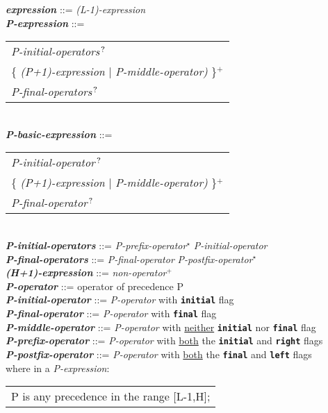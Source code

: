 \documentclass[12pt]{article}
\newcommand{\TT}[1]{{\tt \bfseries #1}}
\newcommand{\STAR}{{\Large $^\star$}}
\newcommand{\PLUS}[1][]{{$^{+#1}$}}
\newcommand{\QMARK}{{$^{\,\mbox{\footnotesize ?}}$}}
\newcommand{\emkey}[1]{{\em \bfseries #1}}
\newenvironment{indpar}[1][0.3in]%
	{\begin{list}{}%
		     {\setlength{\itemsep}{0in}%
		      \setlength{\topsep}{0in}%
		      \setlength{\parsep}{1ex}%
		      \setlength{\labelwidth}{#1}%
		      \setlength{\leftmargin}{#1}%
		      \addtolength{\leftmargin}{\labelsep}}%
	 \item}%
	{\end{list}}
\begin{document}
\begin{indpar}
\emkey{expression}\label{EXPRESSION} ::= {\em (L-1)-expression}
\\[0.5ex]
\emkey{P-expression} ::=
    \begin{tabular}[t]{@{}l}
    {\em P-initial-operators}\QMARK{} \\
    \{ {\em (P+1)-expression} $|$ {\em P-middle-operator)} \}\PLUS{} \\
    {\em P-final-operators}\QMARK{} \\
    \end{tabular}
\\[0.5ex]
\emkey{P-basic-expression} ::=
    \begin{tabular}[t]{@{}l}
    {\em P-initial-operator}\QMARK{} \\
    \{ {\em (P+1)-expression} $|$ {\em P-middle-operator)} \}\PLUS{} \\
    {\em P-final-operator}\QMARK{} \\
    \end{tabular}
\\[0.5ex]
\emkey{P-initial-operators} ::= {\em P-prefix-operator}\STAR{}
				{\em P-initial-operator}
\\[0.5ex]
\emkey{P-final-operators} ::= {\em P-final-operator}
				{\em P-postfix-operator}\STAR{}
\\[0.5ex]
\emkey{(H+1)-expression} ::= {\em non-operator}\PLUS{}
\\[0.5ex]
\emkey{P-operator} ::= operator of precedence P
\\[0.5ex]
\emkey{P-initial-operator} ::= {\em P-operator} with \TT{initial} flag
\\[0.5ex]
\emkey{P-final-operator} ::= {\em P-operator} with \TT{final} flag
\\[0.5ex]
\emkey{P-middle-operator} ::= {\em P-operator} with \underline{neither}
                              \TT{initial} nor \TT{final} flag
\\[0.5ex]
\emkey{P-prefix-operator} ::= {\em P-operator} with \underline{both}
                              the \TT{initial} and \TT{right} flags
\\[0.5ex]
\emkey{P-postfix-operator} ::= {\em P-operator} with \underline{both}
                               the \TT{final} and \TT{left} flags
\\[2.0ex]
where in a {\em P-expression}: \\
\hspace*{1em}\begin{tabular}[t]{l}
       P is any precedence in the range [L-1,H]; \\

\end{tabular}
\end{indpar}
\end{document}
